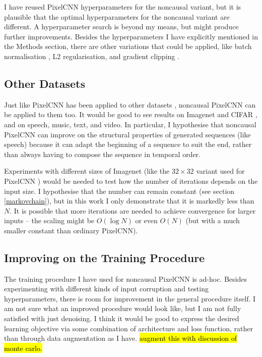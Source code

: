 \documentclass[10pt,a4paper]{article}
\begin{document}
I have reused PixelCNN hyperparameters for the noncausal variant, but it is plausible that the optimal hyperparameters for the noncausal variant are different. A hyperparameter search is beyond my means, but might produce further improvements. Besides the hyperparameters I have explicitly mentioned in the Methods section, there are other variations that could be applied, like batch normalisation \citep{batchnormalisation}, L2 regularisation, and gradient clipping \citep{gradientclipping}.

\subsection{Other Datasets}

Just like PixelCNN has been applied to other datasets \citep{pixelcnn2,wavenet,bytenet,videopixel}, noncausal PixelCNN can be applied to them too. It would be good to see results on Imagenet \citep{imagenet} and CIFAR \citep{cifar}, and on speech, music, text, and video. In particular, I hypothesise that noncausal PixelCNN can improve on the structural properties of generated sequences (like speech) because it can adapt the beginning of a sequence to suit the end, rather than always having to compose the sequence in temporal order.

Experiments with different sizes of Imagenet (like the $32\times 32$ variant used for PixelCNN \citep{pixelcnn2}) would be needed to test how the number of iterations depends on the input size. I hypothesise that the number can remain constant (see section \ref{markovchain}), but in this work I only demonstrate that it is markedly less than $N$. It is possible that more iterations are needed to achieve convergence for larger inputs -- the scaling might be $O(\log{N})$ or even $O(N)$ (but with a much smaller constant than ordinary PixelCNN).

\subsection{Improving on the Training Procedure}

The training procedure I have used for noncausal PixelCNN is ad-hoc. Besides experimenting with different kinds of input corruption and testing hyperparameters, there is room for improvement in the general procedure itself. I am not sure what an improved procedure would look like, but I am not fully satisfied with just denoising. I think it would be good to express the desired learning objective via some combination of architecture and loss function, rather than through data augmentation as I have. \hl{augment this with discussion of monte carlo.}
\end{document}
